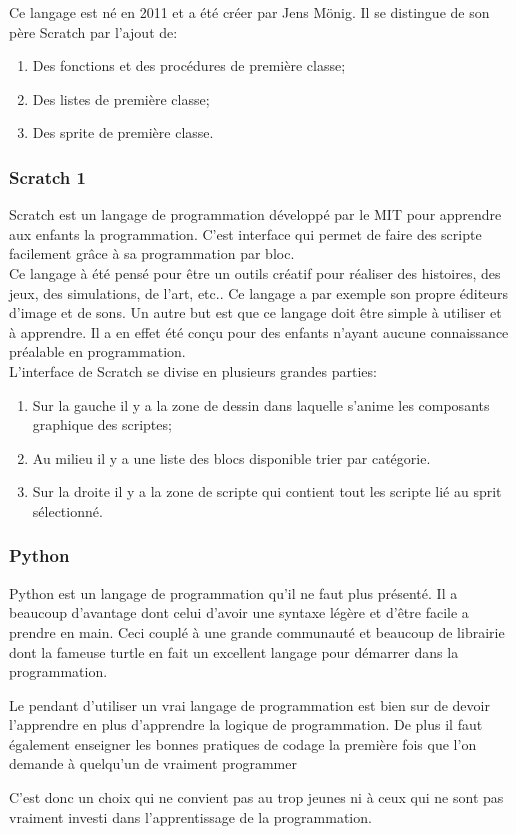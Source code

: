 Ce langage est né en 2011 et a été créer par Jens Mönig. Il se distingue de son père Scratch par l'ajout de:
\begin{enumerate}
\item Des fonctions et des procédures de première classe;
\item Des listes de première classe;
\item Des sprite de première classe.
\end{enumerate}

\subsubsection{Scratch 1}
Scratch est un langage de programmation développé par le MIT pour apprendre aux enfants la programmation. C'est interface qui permet de faire des scripte facilement grâce à sa programmation par bloc.\\

Ce langage à été pensé pour être un outils créatif pour réaliser des histoires, des jeux, des simulations, de l'art, etc.. Ce langage a par exemple son propre éditeurs d'image et de sons. Un autre but est que ce langage doit être simple à utiliser et à apprendre. Il a en effet été conçu pour des enfants n'ayant aucune connaissance préalable en programmation.\\

L'interface de Scratch se divise en plusieurs grandes parties:
\begin{enumerate}
\item Sur la gauche il y a la zone de dessin dans laquelle s'anime les composants graphique des scriptes;
\item Au milieu il y a une liste des blocs disponible trier par catégorie.
\item Sur la droite il y a la zone de scripte qui contient tout les scripte lié au sprit sélectionné.
\end{enumerate}

\subsubsection{Python}
Python est un langage de programmation qu'il ne faut plus présenté. Il a beaucoup d'avantage dont celui d'avoir une syntaxe légère et d'être facile a prendre en main. Ceci couplé à une grande communauté et beaucoup de librairie dont la fameuse turtle en fait un excellent langage pour démarrer dans la programmation.

Le pendant d'utiliser un vrai langage de programmation est bien sur de devoir l'apprendre en plus d'apprendre la logique de programmation. De plus il faut également enseigner les bonnes pratiques de codage la première fois que l'on demande à quelqu'un de vraiment programmer 

C'est donc un choix qui ne convient pas au trop jeunes ni à ceux qui ne sont pas vraiment investi dans l'apprentissage de la programmation.
